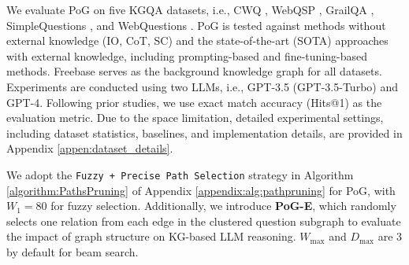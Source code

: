 We evaluate PoG on five KGQA datasets, i.e., CWQ \cite{talmor-berant-2018-web}, WebQSP \cite{yih-etal-2016-value}, GrailQA \cite{grailqa}, SimpleQuestions \cite{simplequestions}, and WebQuestions \cite{berant-etal-2013-semantic}. PoG is tested against methods without external knowledge (IO, CoT\cite{wei2022cot}, SC\cite{wang2022self}) and the state-of-the-art (SOTA) approaches with external knowledge, including prompting-based and fine-tuning-based methods. Freebase \cite{freebase} serves as the background knowledge graph for all datasets. Experiments are conducted using two LLMs, i.e., GPT-3.5 (GPT-3.5-Turbo) and GPT-4. Following prior studies, we use exact match accuracy (Hits@1) as the evaluation metric. Due to the space limitation, detailed experimental settings, including dataset statistics, baselines, and implementation details, are provided in Appendix \ref{appen:dataset_details}.



We adopt the \texttt{Fuzzy + Precise Path Selection} strategy in Algorithm \ref{algorithm:PathsPruning} of Appendix \ref{appendix:alg:pathpruning} for PoG, with $W_1 = 80$ for fuzzy selection. Additionally, we introduce \textbf{PoG-E}, which randomly selects one relation from each edge in the clustered question subgraph to evaluate the impact of graph structure on KG-based LLM reasoning. $W_{\max}$ and $D_{\max}$ are 3 by default for beam search.



\vspace{-1pt}
